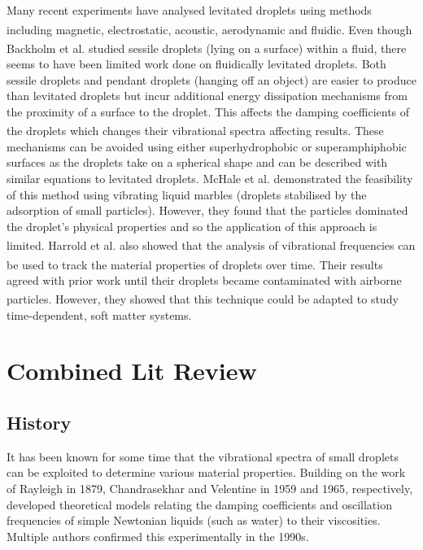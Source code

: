 \documentclass{physics_article_B}
\begin{document}
Many recent experiments have analysed levitated droplets using methods including magnetic\textsuperscript{\cite{hill}}, electrostatic\textsuperscript{\cite{mugele}}, acoustic\textsuperscript{\cite{trinh}}, aerodynamic\textsuperscript{\cite{benmore}} and fluidic\textsuperscript{\cite{Backholm2017}}. Even though Backholm et al. studied sessile droplets (lying on a surface) within a fluid\textsuperscript{\cite{Backholm2017}}, there seems to have been limited work done on fluidically levitated droplets. Both sessile droplets and pendant droplets (hanging off an object) are easier to produce than levitated droplets but incur additional energy dissipation mechanisms from the proximity of a surface to the droplet. This affects the damping coefficients of the droplets which changes their vibrational spectra  affecting results\textsuperscript{\cite{sharp}}. These mechanisms can be avoided using either superhydrophobic or superamphiphobic surfaces as the droplets take on a spherical shape and can be described with similar equations to levitated droplets. McHale et al. demonstrated the feasibility of this method using vibrating liquid marbles (droplets stabilised by the adsorption of small particles). However, they found that the particles dominated the droplet's physical properties and so the application of this approach is limited\textsuperscript{\cite{mchale}}.  Harrold et al. also showed that the analysis of vibrational frequencies can be used to track the material properties of droplets over time\textsuperscript{\cite{harrold2}}. Their results agreed with prior work until their droplets became contaminated with airborne particles\textsuperscript{\cite{harrold2}}. However, they showed that this technique could be adapted to study time-dependent, soft matter systems.

\section{Combined Lit Review\label{sect:lit}}

\subsection{History}
It has been known for some time that the vibrational spectra of small droplets can be exploited to determine various material properties. Building on the work\cite{rayleigh} of Rayleigh in 1879, Chandrasekhar and Velentine in 1959\cite{chandrasekhar2} and 1965\cite{velentine}, respectively, developed theoretical models relating the damping coefficients and oscillation frequencies of simple Newtonian liquids (such as water) to their viscosities. Multiple authors confirmed this experimentally in the 1990s\cite{Egry1998,Meier2000}. 
\end{document}
